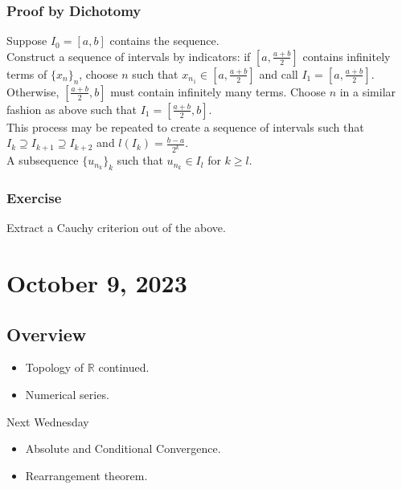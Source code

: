 \documentclass[11pt]{article}
\newcommand{\0}{\emptyset}
\newcommand{\R}{\mathbb{R}}
\begin{document}
\subsubsection*{Proof by Dichotomy}
\label{sec:org4542eef}
Suppose \(I_{0}=[a,b]\) contains the sequence.\\[0pt]
Construct a sequence of intervals by indicators: if \(\left[ a,\frac{a+b}{2} \right]\) contains infinitely terms of \(\{x_{n}\}_{n}\), choose \(n\) such that \(x_{n_{1}}\in\left[ a,\frac{a+b}{2} \right]\) and call \(I_{1}=\left[ a,\frac{a+b}{2} \right]\).\\[0pt]
Otherwise, \(\left[ \frac{a+b}{2},b \right]\) must contain infinitely many terms. Choose \(n\) in a similar fashion as above such that \(I_{1}=\left[ \frac{a+b}{2},b \right]\).\\[0pt]
This process may be repeated to create a sequence of intervals such that \(I_{k}\supseteq I_{k+1}\supseteq I_{k+2}\) and \(l(I_{k})=\frac{b-a}{2^{k}}\).\\[0pt]
A subsequence \(\{u_{n_{k}}\}_{k}\) such that \(u_{n_{k}}\in I_{l}\) for \(k\geq l\).\\[0pt]
\subsubsection*{Exercise}
\label{sec:org70b8613}
Extract a Cauchy criterion out of the above.\\[0pt]
\section*{October 9, 2023}
\label{sec:orgc73ecd3}
\subsection*{Overview}
\label{sec:org852d401}
\begin{itemize}
\item Topology of \(\R\) continued.\\[0pt]
\item Numerical series.\\[0pt]
\end{itemize}
Next Wednesday\\[0pt]
\begin{itemize}
\item Absolute and Conditional Convergence.\\[0pt]
\item Rearrangement theorem.\\[0pt]
\end{itemize}
\end{document}
